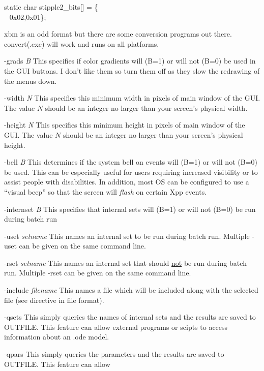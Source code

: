 \begin{description}
\begin{center}
\begin{minipage}{65ex}
\begin{center}
\begin{minipage}{40ex}
static char stipple2\_bits[] = \{ \\
$~~$ 0x02,0x01\};
\end{minipage}\end{center}
\end{minipage}\end{center}
xbm is an odd format but there are some conversion programs out there. convert(.exe) will work and runs on all platforms. 
\item{-grads \emph{B}} This specifies if color gradients will (B=1) or will not (B=0) be used in the GUI buttons. I don't like them so turn them off as they slow the redrawing of the menus down. 
\item{-width  \emph{N}} This specifies this minimum width in pixels of main window of the GUI. The value $N$ should be an integer no larger than your screen's physical width.
\item{-height \emph{N}} This specifies this minimum height in pixels of main window of the GUI. The value $N$ should be an integer no larger than your screen's physical height.              
\item{-bell \emph{B}} This determines if the system bell on events will (B=1) or will not (B=0) be used.  This can be especially useful
for users requiring increased visibility or to assist people with disabilities.  In addition, most OS can be configured to use a ``visual beep''
so that the screen will \emph{flash} on certain Xpp events. 
\item{-internset \emph{B}} This specifies that internal sets will (B=1) or will not (B=0) be run during batch run
\item{-uset \emph{setname}}  This names an internal set to be run during batch run.  Multiple -uset can be given on the same command line.
\item{-rset \emph{setname}} This names an internal set that should \underline{not} be run during batch run. Multiple -rset can be given on the same command line.
\item{-include \emph{filename}} This names a file which will be included along with the selected {} file (see {} directive in {} file format).
\item{-qsets} This simply queries the names of internal sets and the results are saved to OUTFILE.  This feature can allow 
external programs or scipts to access information about an .ode model. 
\item{-qpars} This simply queries the  parameters and the results are saved to OUTFILE.  This feature can allow 

\end{description}
